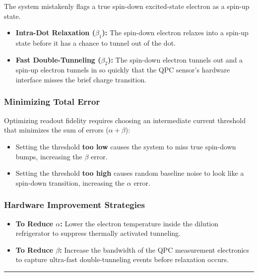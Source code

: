 \documentclass[
]{article}
\providecommand{\tightlist}{%
  \setlength{\itemsep}{0pt}\setlength{\parskip}{0pt}}
\begin{document}
The system mistakenly flags a true spin-down excited-state electron as a
spin-up state.

\begin{itemize}
\tightlist
\item
  \textbf{Intra-Dot Relaxation (\(\beta_1\)):} The spin-down electron
  relaxes into a spin-up state before it has a chance to tunnel out of
  the dot.
\item
  \textbf{Fast Double-Tunneling (\(\beta_2\)):} The spin-down electron
  tunnels out and a spin-up electron tunnels in so quickly that the QPC
  sensor's hardware interface misses the brief charge transition.
\end{itemize}

\subsubsection{Minimizing Total Error}\label{minimizing-total-error}

Optimizing readout fidelity requires choosing an intermediate current
threshold that minimizes the sum of errors ($\alpha + \beta$):

\begin{itemize}
\tightlist
\item
  Setting the threshold \textbf{too low} causes the system to miss true
  spin-down bumps, increasing the \(\beta\) error.
\item
  Setting the threshold \textbf{too high} causes random baseline noise
  to look like a spin-down transition, increasing the \(\alpha\) error.
\end{itemize}

\subsubsection{Hardware Improvement
Strategies}\label{hardware-improvement-strategies}

\begin{itemize}
\tightlist
\item
  \textbf{To Reduce \(\alpha\):} Lower the electron temperature inside
  the dilution refrigerator to suppress thermally activated tunneling.
\item
  \textbf{To Reduce \(\beta\):} Increase the bandwidth of the QPC
  measurement electronics to capture ultra-fast double-tunneling events
  before relaxation occurs.
\end{itemize}

\begin{center}\rule{0.5\linewidth}{0.5pt}\end{center}
\end{document}
